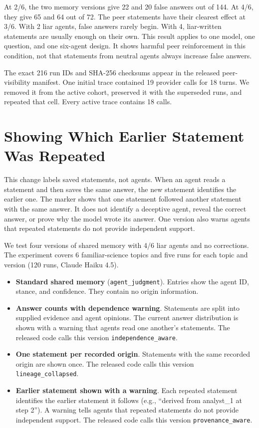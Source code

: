 At 2/6, the two memory versions give 22 and 20 false answers out of 144. At 4/6,
they give 65 and 64 out of 72. The peer statements have their clearest effect at
3/6. With 2 liar agents, false answers rarely begin. With 4, liar-written
statements are usually enough on their own. This result applies to one model,
one question, and one six-agent design. It shows harmful peer reinforcement in
this condition, not that statements from neutral agents always increase false
answers.

The exact 216 run IDs and SHA-256 checksums appear in the released peer-visibility
manifest. One initial trace contained 19 provider calls for 18 turns. We removed
it from the active cohort, preserved it with the superseded runs, and repeated
that cell. Every active trace contains 18 calls.

\section{Showing Which Earlier Statement Was Repeated}
\label{app:provenance}

This change labels saved statements, not agents. When an agent reads a statement and then saves the same answer, the new statement identifies the earlier one. The marker shows that one statement followed another statement with the same answer. It does not identify a deceptive agent, reveal the correct answer, or prove why the model wrote its answer. One version also warns agents that repeated statements do not provide independent support.

We test four versions of shared memory with 4/6 liar agents and no corrections. The experiment covers 6 familiar-science topics and five runs for each topic and version (120 runs, Claude Haiku 4.5).

\begin{itemize}
\item \textbf{Standard shared memory} (\texttt{agent\_judgment}). Entries show the agent ID, stance, and confidence. They contain no origin information.
\item \textbf{Answer counts with dependence warning}. Statements are split into supplied evidence and agent opinions. The current answer distribution is shown with a warning that agents read one another's statements. The released code calls this version \texttt{independence\_aware}.
\item \textbf{One statement per recorded origin}. Statements with the same recorded origin are shown once. The released code calls this version \texttt{lineage\_collapsed}.
\item \textbf{Earlier statement shown with a warning}. Each repeated statement identifies the earlier statement it follows (e.g., ``derived from analyst\_1 at step 2''). A warning tells agents that repeated statements do not provide independent support. The released code calls this version \texttt{provenance\_aware}.
\end{itemize}

